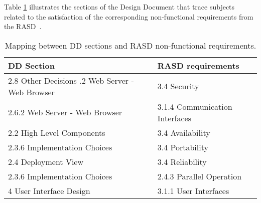 Table \ref{nf_reqs_trace} illustrates the sections of the Design Document that trace subjects related to the satisfaction of the corresponding non-functional requirements from the RASD~\cite{rasd}.

\begin{table}
\begin{center}
\begin{tabular}{p{} | p{}}
\hline
\textbf{DD Section} & \textbf{RASD requirements}\\
\hline
2.8 Other Decisions \newline 2.6.2 Web Server - Web Browser & 3.4 Security \\
\hline
2.6.2 Web Server - Web Browser & 3.1.4 Communication Interfaces \\
\hline
2.2 High Level Components & 3.4 Availability \\
\hline
2.3.6 Implementation Choices & 3.4 Portability \\
\hline
2.4 Deployment View & 3.4 Reliability \\
\hline
2.3.6 Implementation Choices & 2.4.3 Parallel Operation \\
\hline
4 User Interface Design & 3.1.1 User Interfaces \\
\hline
\end{tabular}
\end{center}
\caption{Mapping between DD sections and RASD non-functional requirements.}
\label{nf_reqs_trace}
\end{table}